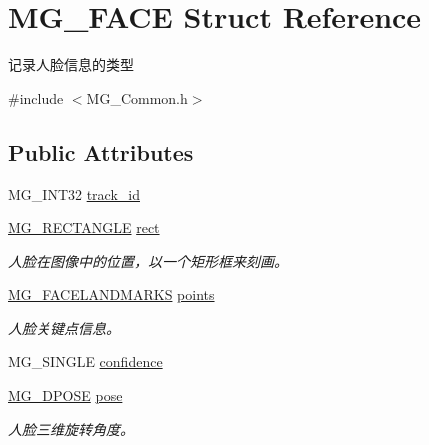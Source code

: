 \hypertarget{struct_m_g___f_a_c_e}{}\section{M\+G\+\_\+\+F\+A\+CE Struct Reference}
\label{struct_m_g___f_a_c_e}


记录人脸信息的类型  




{\ttfamily \#include $<$M\+G\+\_\+\+Common.\+h$>$}

\subsection*{Public Attributes}
\begin{DoxyCompactItemize}
\item 
M\+G\+\_\+\+I\+N\+T32 \hyperlink{struct_m_g___f_a_c_e_a71e1f0316c4696a7a98bd2dfb7b817e0}{track\+\_\+id}
\item 
\mbox{\label{struct_m_g___f_a_c_e_ac6790410b21dead51c8c87924df5ca7e}} 
\hyperlink{struct_m_g___r_e_c_t_a_n_g_l_e}{M\+G\+\_\+\+R\+E\+C\+T\+A\+N\+G\+LE} \hyperlink{struct_m_g___f_a_c_e_ac6790410b21dead51c8c87924df5ca7e}{rect}
\begin{DoxyCompactList}\small\item\em 人脸在图像中的位置，以一个矩形框来刻画。 \end{DoxyCompactList}\item 
\mbox{\label{struct_m_g___f_a_c_e_ae71833422ba21bf764407e1a7153ab31}} 
\hyperlink{struct_m_g___f_a_c_e_l_a_n_d_m_a_r_k_s}{M\+G\+\_\+\+F\+A\+C\+E\+L\+A\+N\+D\+M\+A\+R\+KS} \hyperlink{struct_m_g___f_a_c_e_ae71833422ba21bf764407e1a7153ab31}{points}
\begin{DoxyCompactList}\small\item\em 人脸关键点信息。 \end{DoxyCompactList}\item 
M\+G\+\_\+\+S\+I\+N\+G\+LE \hyperlink{struct_m_g___f_a_c_e_ab61f801c8d14f8686654facb639bb763}{confidence}
\item 
\mbox{\label{struct_m_g___f_a_c_e_ad83ae3bee9efa82f1960e142cb4eef23}} 
\hyperlink{struct_m_g__3_d_p_o_s_e}{M\+G\+\_\+D\+P\+O\+SE} \hyperlink{struct_m_g___f_a_c_e_ad83ae3bee9efa82f1960e142cb4eef23}{pose}
\begin{DoxyCompactList}\small\item\em 人脸三维旋转角度。 \end{DoxyCompactList}\item 

\end{DoxyCompactItemize}
